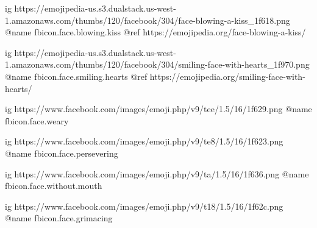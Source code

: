  
 
 
 
 

\ifcmt

  ig https://emojipedia-us.s3.dualstack.us-west-1.amazonaws.com/thumbs/120/facebook/304/face-blowing-a-kiss_1f618.png
  @name fbicon.face.blowing.kiss
  @ref https://emojipedia.org/face-blowing-a-kiss/

  ig https://emojipedia-us.s3.dualstack.us-west-1.amazonaws.com/thumbs/120/facebook/304/smiling-face-with-hearts_1f970.png
  @name fbicon.face.smiling.hearts
  @ref https://emojipedia.org/smiling-face-with-hearts/

  ig https://www.facebook.com/images/emoji.php/v9/tee/1.5/16/1f629.png
  @name fbicon.face.weary

  ig https://www.facebook.com/images/emoji.php/v9/te8/1.5/16/1f623.png
  @name fbicon.face.persevering

  ig https://www.facebook.com/images/emoji.php/v9/ta/1.5/16/1f636.png
  @name fbicon.face.without.mouth

  ig https://www.facebook.com/images/emoji.php/v9/t18/1.5/16/1f62c.png
  @name fbicon.face.grimacing

	
\fi
